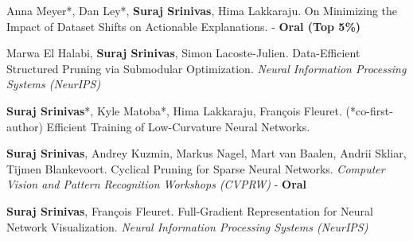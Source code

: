 \documentclass[11pt, a4paper, english]{moderncv}        %
\begin{document}
 {Anna Meyer*, Dan Ley*, \textbf{Suraj Srinivas}, Hima Lakkaraju. \newline On Minimizing the Impact of Dataset Shifts on Actionable Explanations.  - \textbf{Oral (Top 5\%)}
}
\vspace*{0.25em}

 {Marwa El Halabi, \textbf{Suraj Srinivas}, Simon Lacoste-Julien.
\newline Data-Efficient Structured Pruning via Submodular Optimization. \newline \textit{Neural Information Processing Systems (NeurIPS)}}

\vspace*{0.25em}
 {\textbf{Suraj Srinivas}*, Kyle Matoba*, Hima Lakkaraju, Fran\c{c}ois Fleuret. (*co-first-author) \newline Efficient Training of Low-Curvature Neural Networks. 
}

\vspace*{0.25em}
 {\textbf{Suraj Srinivas}, Andrey Kuzmin, Markus Nagel, Mart van Baalen, \newline Andrii Skliar, Tijmen Blankevoort. \newline Cyclical Pruning for Sparse Neural Networks. 
\newline \textit{Computer Vision and Pattern Recognition Workshops (CVPRW)} - \textbf{Oral}}

\vspace*{0.25em}

\vspace*{0.25em}

 {\textbf{Suraj Srinivas}, Fran\c{c}ois Fleuret. \newline Full-Gradient Representation
for Neural Network Visualization. \newline \textit{Neural Information Processing Systems (NeurIPS)}
}

\vspace*{0.25em}
\end{document}
